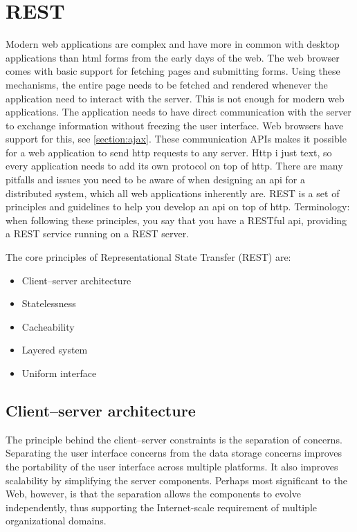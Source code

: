\section{REST} \label{section:rest}
Modern web applications are complex and have more in common with desktop applications than html forms from the early days of the web. The web browser comes with basic support for fetching pages and submitting forms. Using these mechanisms, the entire page needs to be fetched and rendered whenever the application need to interact with the server. This is not enough for modern web applications. The application needs to have direct communication with the server to exchange information without freezing the user interface. Web browsers have support for this, see \ref{section:ajax}. These communication APIs makes it possible for a web application to send http requests to any server. Http i just text, so every application needs to add its own protocol on top of http. There are many pitfalls and issues you need to be aware of when designing an api for a distributed system, which all web applications inherently are. REST is a set of principles and guidelines to help you develop an api on top of http. Terminology: when following these principles, you say that you have a RESTful api, providing a REST service running on a REST server.

The core principles of Representational State Transfer (REST) are:
\begin{itemize}
\item Client–server architecture
\item Statelessness
\item Cacheability
\item Layered system
\item Uniform interface
\end{itemize}

\subsection{Client–server architecture}
The principle behind the client–server constraints is the separation of concerns. Separating the user interface concerns from the data storage concerns improves the portability of the user interface across multiple platforms. It also improves scalability by simplifying the server components. Perhaps most significant to the Web, however, is that the separation allows the components to evolve independently, thus supporting the Internet-scale requirement of multiple organizational domains.

